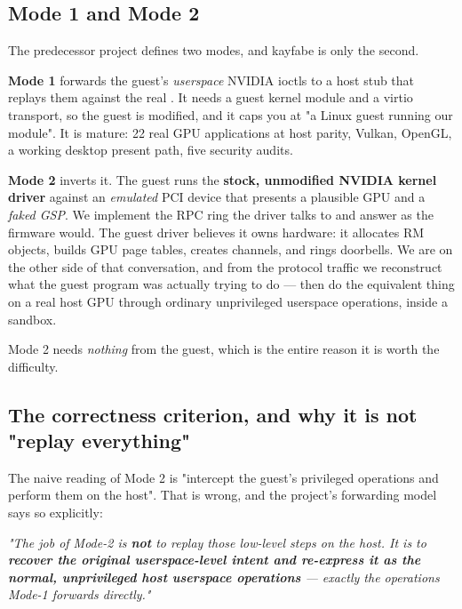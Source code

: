 \documentclass[10.5pt]{article}
\begin{document}
\subsection{Mode 1 and Mode 2}

The predecessor project defines two modes, and kayfabe is only the second.

\textbf{Mode 1} forwards the guest's \emph{userspace} NVIDIA ioctls to a host stub that replays
them against the real . It needs a guest kernel module and a virtio
transport, so the guest is modified, and it caps you at "a Linux guest running our module". It
is mature: 22 real GPU applications at host parity, Vulkan, OpenGL, a working desktop present
path, five security audits.

\textbf{Mode 2} inverts it. The guest runs the \textbf{stock, unmodified NVIDIA kernel driver}
against an \emph{emulated} PCI device that presents a plausible GPU and a \emph{faked GSP}. We
implement the RPC ring the driver talks to and answer as the firmware would. The guest driver
believes it owns hardware: it allocates RM objects, builds GPU page tables, creates channels,
and rings doorbells. We are on the other side of that conversation, and from the protocol
traffic we reconstruct what the guest program was actually trying to do — then do the
equivalent thing on a real host GPU through ordinary unprivileged userspace operations, inside
a sandbox.

Mode 2 needs \emph{nothing} from the guest, which is the entire reason it is worth the
difficulty.

\subsection{The correctness criterion, and why it is not "replay everything"}

The naive reading of Mode 2 is "intercept the guest's privileged operations and perform them on
the host". That is wrong, and the project's forwarding model says so explicitly:

\begin{claimbox}\small
\emph{"The job of Mode-2 is \textbf{not} to replay those low-level steps on the host. It is to
\textbf{recover the original userspace-level intent and re-express it as the normal,
unprivileged host userspace operations} — exactly the operations Mode-1 forwards directly."}
\hfill {}
\end{claimbox}
\end{document}
